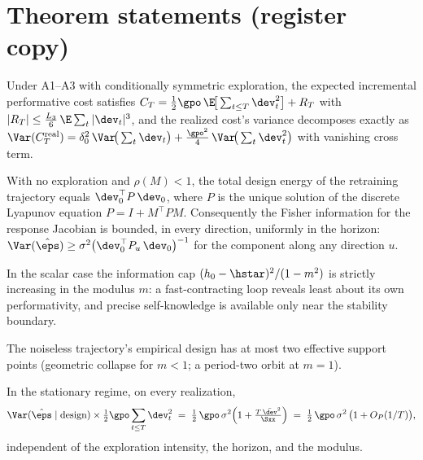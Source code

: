 \documentclass[11pt]{article}
\begin{document}
\section*{Theorem statements (register copy)}


\begin{lemma}
Under A1--A3 with conditionally symmetric exploration, the expected
incremental performative cost satisfies
$C_T = \tfrac{1}{2}\gpo\,\E\!\big[\sum_{t\le T}\dev_t^2\big] + R_T$ with
$|R_T| \le \tfrac{L_3}{6}\,\E\sum_t |\dev_t|^3$, and the realized cost's
variance decomposes exactly as
$\Var(C_T^{\mathrm{real}}) = \delta_0^2\,\Var\!\big(\sum_t \dev_t\big)
+ \tfrac{\gpo^2}{4}\,\Var\!\big(\sum_t \dev_t^2\big)$
with vanishing cross term.
\end{lemma}

\begin{theorem}
With no exploration and $\rho(M)<1$, the total design energy of the
retraining trajectory equals $\dev_0^\top P\,\dev_0$, where $P$ is the
unique solution of the discrete Lyapunov equation $P = I + M^\top P M$.
Consequently the Fisher information for the response Jacobian is bounded,
in every direction, uniformly in the horizon:
$\Var(\hat\eps) \ge \sigma^2\big(\dev_0^\top P_u\,\dev_0\big)^{-1}$ for the
component along any direction $u$.
\end{theorem}

\begin{corollary}
In the scalar case the information cap $(h_0-\hstar)^2/(1-m^2)$ is strictly
increasing in the modulus $m$: a fast-contracting loop reveals least about
its own performativity, and precise self-knowledge is available only near
the stability boundary.
\end{corollary}

\begin{corollary}
The noiseless trajectory's empirical design has at most two effective
support points (geometric collapse for $m<1$; a period-two orbit at
$m=1$).
\end{corollary}

\begin{theorem}
In the stationary regime, on every realization,
\[
\Var(\hat\eps \mid \mathrm{design}) \times \tfrac{1}{2}\gpo \sum_{t\le T}
\dev_t^2 \;=\; \tfrac{1}{2}\,\gpo\,\sigma^2\Big(1 +
\tfrac{T\,\bar{\dev}^2}{\Sxx}\Big)
\;=\; \tfrac{1}{2}\,\gpo\,\sigma^2\,\big(1 + O_P(1/T)\big),
\]
independent of the exploration intensity, the horizon, and the modulus.
\end{theorem}
\end{document}
